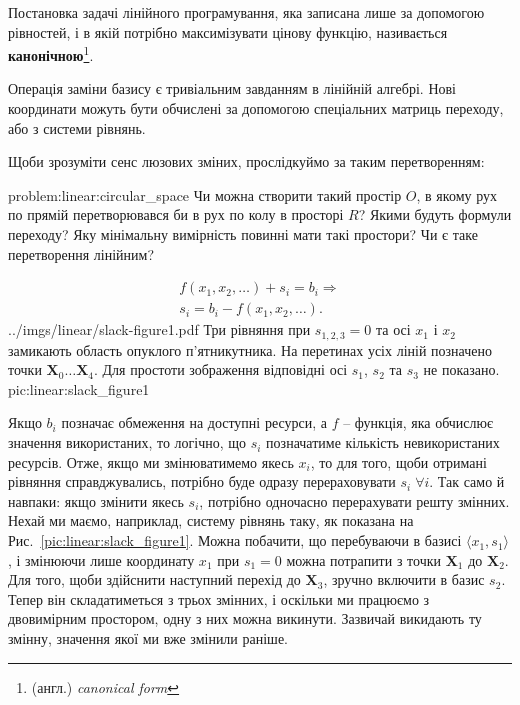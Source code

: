 \documentclass[\main/book.tex]{subfiles}
\begin{document}
Постановка задачі лінійного програмування, яка записана лише за допомогою рівностей, і в якій потрібно максимізувати цінову функцію, називається \textbf{канонічною}\footnote{(англ.) \textit{canonical form}}.
\begin{note}
  Операція заміни базису є тривіальним завданням в лінійній алгебрі. Нові координати можуть бути обчислені за допомогою спеціальних матриць переходу, або з системи рівнянь.
\end{note}

Щоби зрозуміти сенс люзових зміних, прослідкуймо за таким перетворенням:
\begin{problem}{problem:linear:circular_space}
 Чи можна створити такий простір $O$, в якому рух по прямій перетворювався би в рух по колу в просторі $R$? Якими будуть формули переходу? Яку мінімальну вимірність повинні мати такі простори? Чи є таке перетворення лінійним?
\end{problem}

\begin{equation}
\begin{split}
 f(x_1, x_2, \ldots) + s_i = b_i \Rightarrow \\
 s_i = b_i - f(x_1, x_2, \ldots).
\end{split}
\label{eq:linear:slack_variables}
\end{equation}
\illustration
 {../imgs/linear/slack-figure1.pdf}
 {Три рівняння при $s_{1,2,3}=0$ та осі $x_1$ і $x_2$ замикають область опуклого п'ятникутника. На перетинах усіх ліній позначено точки ${\mathbf{X}_0 \ldots \mathbf{X}_4}$. Для простоти зображення відповідні осі $s_1$, $s_2$ та $s_3$ не показано.}
 {pic:linear:slack_figure1}

Якщо $b_i$ позначає обмеження на доступні ресурси, а $f$ -- функція, яка обчислює значення використаних, то логічно, що $s_i$ позначатиме кількість невикористаних ресурсів. Отже, якщо ми змінюватимемо якесь $x_i$, то для того, щоби отримані рівняння справджувались, потрібно буде одразу перераховувати ${s_i \; \forall i}$. Так само й навпаки: якщо змінити якесь $s_i$, потрібно одночасно перерахувати решту змінних.
Нехай ми маємо, наприклад, систему рівнянь таку, як показана на Рис.~\ref{pic:linear:slack_figure1}. Можна побачити, що перебуваючи в базисі ${\langle x_1, s_1 \rangle}$, і змінюючи лише координату $x_1$ при $s_1 = 0$ можна потрапити з точки $\mathbf{X}_1$ до $\mathbf{X}_2$. Для того, щоби здійснити наступний перехід до $\mathbf{X}_3$, зручно включити в базис $s_2$. Тепер він складатиметься з трьох змінних, і оскільки ми працюємо з двовимірним простором, одну з них можна \flqq{}викинути\frqq{}. Зазвичай \flqq{}викидають\frqq{} ту змінну, значення якої ми вже змінили раніше.
\end{document}
